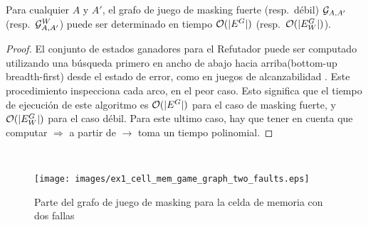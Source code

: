 \begin{thm}\label{th:game-determined}
  Para cualquier $A$ y $A'$, el grafo de juego de masking fuerte (resp.\ débil) 
  $\mathcal{G}_{A, A'}$ (resp.\ $\mathcal{G}^W_{A,A'}$) puede ser determinado en tiempo $\mathcal{O}(|E^G|)$ (resp.\ $\mathcal{O}(|E_W^G|)$).
\end{thm}
\begin{proof}
	El conjunto de estados ganadores para el Refutador puede ser computado utilizando una búsqueda primero en ancho de abajo hacia arriba(bottom-up breadth-first) desde el estado de error, como en juegos de alcanzabilidad \cite{Jurd11}. 
Este procedimiento inspecciona cada arco, en el peor caso. Esto significa que el tiempo de ejecución de este algoritmo es $\mathcal{O}(|E^G|)$ para el caso de masking fuerte, y $\mathcal{O}(|E_W^G|)$ para el caso débil. Para este ultimo caso, hay que tener en cuenta que computar  
$\Rightarrow$ a partir de $\rightarrow$ toma un tiempo polinomial.
\qedhere
\end{proof} \\
\begin{figure} [h]
\begin{center}
    \texttt{[image: images/ex1\_cell\_mem\_game\_graph\_two\_faults.eps]} 
    \caption{Parte del grafo de juego de masking para la celda de memoria con dos fallas}
    \label{figure:exam_2_mem_cell_gg_two_faults}
\end{center}
\end{figure}

